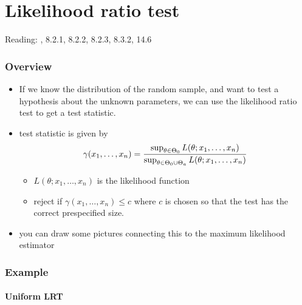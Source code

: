 
\part*{Likelihood ratio test}%

Reading: \citet{CaB_2001}, 8.2.1, 8.2.2, 8.2.3, 8.3.2,
\citet{Gre_2011} 14.6

\section{Overview}

\begin{itemize}
\item If we know the distribution of the random sample, and want to
      test a hypothesis about the unknown parameters, we can use the
      likelihood ratio test to get a test statistic.
\item test statistic is given by
      \[\gamma(x_1,\dots,x_n) = {\sup_{\theta \in \Theta_0} L(\theta;
      x_1,\dots,x_n) \over \sup_{\theta \in \Theta_0 \cup \Theta_a} L(\theta;
      x_1,\dots,x_n)}\]
\begin{itemize}
\item $L(\theta; x_1,\dots,x_n)$ is the likelihood function
\item reject if $\gamma(x_1,\dots,x_n) \leq c$ where $c$ is chosen
        so that the test has the correct prespecified size.
\end{itemize}
\item you can draw some pictures connecting this to the maximum
      likelihood estimator
\end{itemize}

\section{Example}

\subsection{Uniform LRT}

